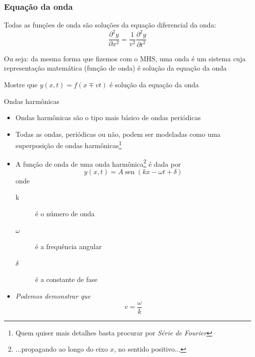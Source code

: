 \documentclass[t,%
brazilian,%
11pt,%
aspectratio=169,%
table%
]{beamer}
\DeclareMathOperator{\sen}{sen}
\begin{document}
\begin{frame}
    \frametitle{Equação da onda}
    Todas as funções de onda são soluções da equação diferencial da onda:
    \[
        \frac{\partial^2 y}{\partial x^2} = \frac{1}{v^2}\frac{\partial^2 y}{\partial t^2}
    \]

    Ou seja: da mesma forma que fizemos com o MHS, uma onda é um sistema cuja
    representação matemática (função de onda) é solução da equação da onda

    \vfill

    \pause
    Mostre que \(y(x,t)=f(x\mp vt)\) é solução da equação da onda
\end{frame}

\begin{frame}{Ondas harmônicas}
    \begin{itemize}
        \item Ondas harmônicas são o tipo mais básico de ondas periódicas
        \item  Todas as ondas, periódicas ou não, podem ser modeladas como 
            uma superposição de ondas harmônicas\footnote{Quem quiser mais 
            detalhes basta procurar por \textit{Série de Fourier}}
        \item A função de onda de uma onda harmônica\footnote{...propagando
            ao longo do eixo \(x\), no sentido positivo...} é dada por
            \[
                y(x,t)=A\sen{(kx-\omega t+\delta)}
            \]
            onde
            \begin{description}
                \item[k] é o número de onda
                \item[$\omega$] é a frequência angular
                \item[$\delta$] é a constante de fase
            \end{description}
        \item \textit{Podemos demonstrar que}
            \[
                v=\frac{\omega}{k}
            \]
    \end{itemize}
\end{frame}
\end{document}
